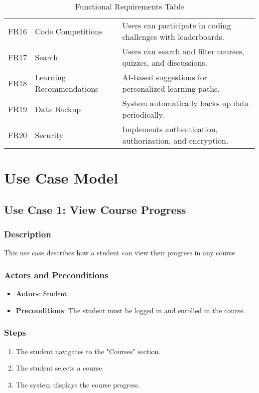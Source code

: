 \documentclass[a4paper, 11pt]{scrreprt}
\begin{document}
\begin{table}[h!]
\begin{tabular}{|c|l|p{10cm}|}
    FR16 & Code Competitions & Users can participate in coding challenges with leaderboards. \\
    FR17 & Search & Users can search and filter courses, quizzes, and discussions. \\
    FR18 & Learning Recommendations & AI-based suggestions for personalized learning paths. \\
    FR19 & Data Backup & System automatically backs up data periodically. \\
    FR20 & Security & Implements authentication, authorization, and encryption. \\
    \hline
    \end{tabular}
    \caption{Functional Requirements Table}
\end{table}

\section{Use Case Model}
\subsection{Use Case 1: View Course Progress}
\subsubsection{Description}
This use case describes how a student can view their progress in any course

\subsubsection{Actors and Preconditions}
\begin{itemize}
    \item \textbf{Actors}: Student
    \item \textbf{Preconditions}: The student must be logged in and enrolled in the course.
\end{itemize}

\subsubsection{Steps}
\begin{enumerate}
    \item The student navigates to the "Courses" section.
    \item The student selects a course.
    \item The system displays the course progress.
\end{enumerate}
\end{document}
